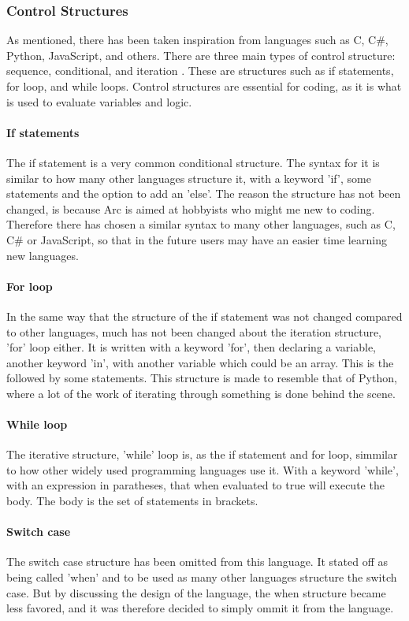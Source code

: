 \subsubsection{Control Structures}
As mentioned, there has been taken inspiration from languages such as C, C\#, Python, JavaScript, and others. There are three main types of control structure: sequence, conditional, and iteration \cite*{CBook}. These are structures such as if statements, for loop, and while loops. Control structures are essential for coding, as it is what is used to evaluate variables and logic.

\paragraph*{If statements}
The if statement is a very common conditional structure. The syntax for it is similar to how many other languages structure it, with a keyword 'if', some statements and the option to add an 'else'. The reason the structure has not been changed, is because Arc is aimed at hobbyists who might me new to coding. Therefore there has chosen a similar syntax to many other languages, such as C, C\# or JavaScript, so that in the future users may have an easier time learning new languages.

\paragraph*{For loop}
In the same way that the structure of the if statement was not changed compared to other languages, much has not been changed about the iteration structure, 'for' loop either. It is written with a keyword 'for', then declaring a variable, another keyword 'in', with another variable which could be an array. This is the followed by some statements.
This structure is made to resemble that of Python, where a lot of the work of iterating through something is done behind the scene.

\paragraph*{While loop}
The iterative structure, 'while' loop is, as the if statement and for loop, simmilar to how other widely used programming languages use it. With a keyword 'while', with an expression in paratheses, that when evaluated to true will execute the body. The body is the set of statements in brackets. 

\paragraph*{Switch case}
The switch case structure has been omitted from this language. It stated off as being called 'when' and to be used as many other languages structure the switch case. But by discussing the design of the language, the when structure became less favored, and it was therefore decided to simply ommit it from the language.
